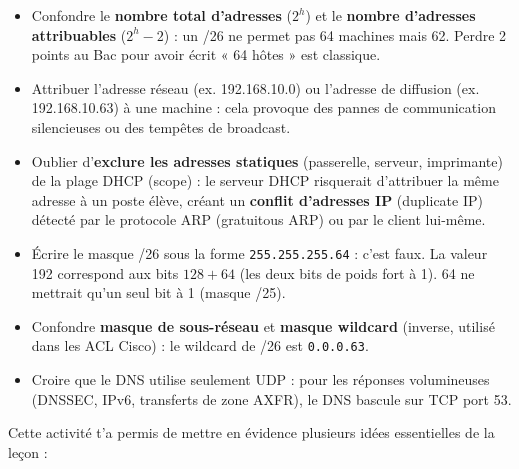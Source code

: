 \documentclass[11pt]{article}
\newcounter{popsec}
\newcounter{popsub}
\newcommand{\courssub}[1]{%
  \stepcounter{popsub}%
  \par\vspace{9pt}\noindent{\popxbold\fontsize{11.5}{13}\selectfont\color{popink}{\color{poporange}\thepopsec.\thepopsub}\hspace{6pt}#1}\par\nopagebreak\vspace{4pt}
}
\begin{document}
\begin{attention}
\begin{itemize}
\item Confondre le \textbf{nombre total d'adresses} ($2^h$) et le \textbf{nombre d'adresses attribuables} ($2^h - 2$) : un /26 ne permet pas 64 machines mais 62. Perdre 2 points au Bac pour avoir écrit « 64 hôtes » est classique.
\item Attribuer l'adresse réseau (ex. 192.168.10.0) ou l'adresse de diffusion (ex. 192.168.10.63) à une machine : cela provoque des pannes de communication silencieuses ou des tempêtes de broadcast.
\item Oublier d'\textbf{exclure les adresses statiques} (passerelle, serveur, imprimante) de la plage DHCP (scope) : le serveur DHCP risquerait d'attribuer la même adresse à un poste élève, créant un \textbf{conflit d'adresses IP} (duplicate IP) détecté par le protocole ARP (gratuitous ARP) ou par le client lui-même.
\item Écrire le masque /26 sous la forme \texttt{255.255.255.64} : c'est faux. La valeur 192 correspond aux bits $128+64$ (les deux bits de poids fort à 1). 64 ne mettrait qu'un seul bit à 1 (masque /25).
\item Confondre \textbf{masque de sous-réseau} et \textbf{masque wildcard} (inverse, utilisé dans les ACL Cisco) : le wildcard de /26 est \texttt{0.0.0.63}.
\item Croire que le DNS utilise seulement UDP : pour les réponses volumineuses (DNSSEC, IPv6, transferts de zone AXFR), le DNS bascule sur TCP port 53.
\end{itemize}
\end{attention}

\courssub{Bilan de l'activité}

Cette activité t'a permis de mettre en évidence plusieurs idées essentielles de la leçon :
\end{document}
